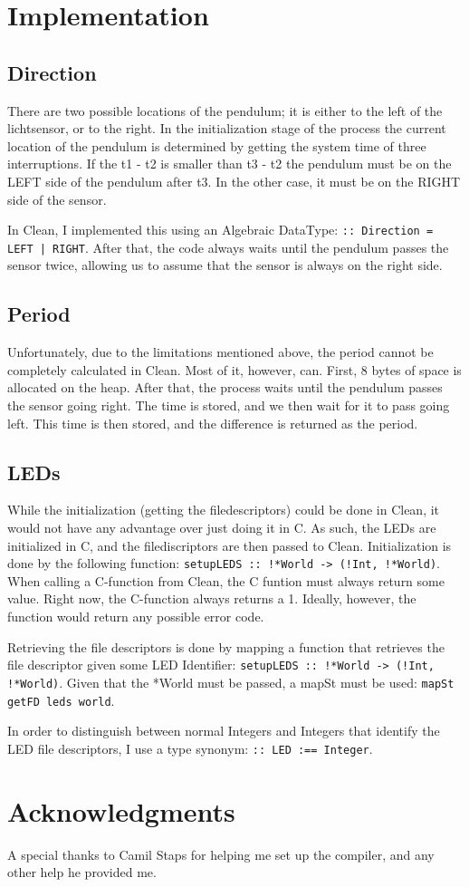 \documentclass{scrartcl}
\begin{document}
\section{Implementation}
\subsection{Direction}
There are two possible locations of the pendulum; it is either to the left of the lichtsensor, or to the right.
In the initialization stage of the process the current location of the pendulum is determined by getting the system time of three interruptions.
If the t1 - t2 is smaller than t3 - t2 the pendulum must be on the LEFT side of the pendulum after t3.
In the other case, it must be on the RIGHT side of the sensor.

In Clean, I implemented this using an Algebraic DataType: \texttt{:: Direction = LEFT | RIGHT}.
After that, the code always waits until the pendulum passes the sensor twice, allowing us to assume that the sensor is always on the right side.

\subsection{Period}
Unfortunately, due to the limitations mentioned above, the period cannot be completely calculated in Clean.
Most of it, however, can.
First, 8 bytes of space is allocated on the heap.
After that, the process waits until the pendulum passes the sensor going right.
The time is stored, and we then wait for it to pass going left.
This time is then stored, and the difference is returned as the period.

\subsection{LEDs}
While the initialization (getting the filedescriptors) could be done in Clean, it would not have any advantage over just doing it in C.
As such, the LEDs are initialized in C, and the filediscriptors are then passed to Clean.
Initialization is done by the following function: \texttt{setupLEDS :: !*World -> (!Int, !*World)}.
When calling a C-function from Clean, the C funtion must always return some value.
Right now, the C-function always returns a 1. Ideally, however, the function would return any possible error code.

Retrieving the file descriptors is done by mapping a function that retrieves the file descriptor given some LED Identifier: \texttt{setupLEDS :: !*World -> (!Int, !*World)}.
Given that the *World must be passed, a mapSt must be used: \texttt{mapSt getFD leds world}.

In order to distinguish between normal Integers and Integers that identify the LED file descriptors, I use a type synonym: \texttt{:: LED :== Integer}.

\section{Acknowledgments}
A special thanks to Camil Staps for helping me set up the compiler, and any other help he provided me.
\end{document}
